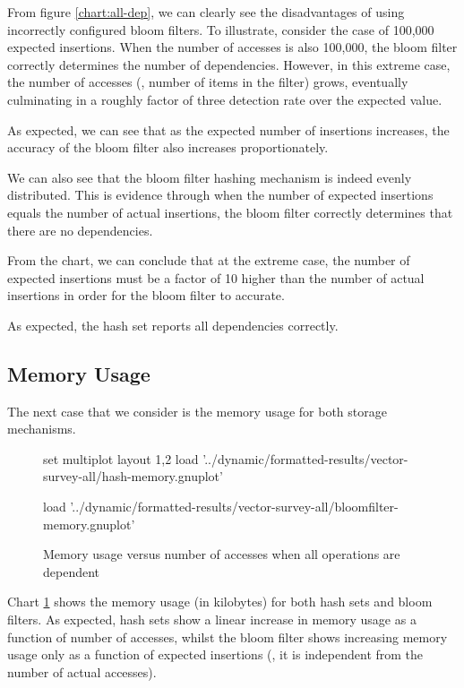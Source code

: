 	From figure \ref{chart:all-dep}, we can clearly see the disadvantages of using incorrectly configured bloom filters. To illustrate, consider the case of 100,000 expected insertions. When the number of accesses is also 100,000, the bloom filter correctly determines the number of dependencies. However, in this extreme case, the number of accesses (\ie, number of items in the filter) grows, eventually culminating in a roughly factor of three detection rate over the expected value.
	
	As expected, we can see that as the expected number of insertions increases, the accuracy of the bloom filter also increases proportionately. 
	
	We can also see that the bloom filter hashing mechanism is indeed evenly distributed. This is evidence through when the number of expected insertions equals the number of actual insertions, the bloom filter correctly determines that there are no dependencies.
	
	From the chart, we can conclude that at the extreme case, the number of expected insertions must be a factor of 10 higher than the number of actual insertions in order for the bloom filter to accurate.
	
	As expected, the hash set reports all dependencies correctly.
		
	\subsection{Memory Usage} \label{sec:results/all/mem}
	The next case that we consider is the memory usage for both storage mechanisms.
	
	\begin{figure}
		\centering
		\begin{gnuplot}[terminal=pdf]
			set multiplot layout 1,2
				load '../dynamic/formatted-results/vector-survey-all/hash-memory.gnuplot'
				
				load '../dynamic/formatted-results/vector-survey-all/bloomfilter-memory.gnuplot'
		\end{gnuplot}
		\caption{Memory usage versus number of accesses when all operations are dependent}
		\label{chart:all-mem}
	\end{figure}
	
	Chart \ref{chart:all-mem} shows the memory usage (in kilobytes) for both hash sets and bloom filters. As expected, hash sets show a linear increase in memory usage as a function of number of accesses, whilst the bloom filter shows increasing memory usage only as a function of expected insertions (\ie, it is independent from the number of actual accesses).
	

